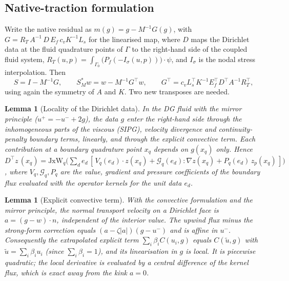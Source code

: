 \documentclass[11pt,a4paper]{article}
\newtheorem{lemma}[proposition]{Lemma}
\theoremstyle{definition}
\theoremstyle{remark}
\newcommand{\G}{\Gamma}
\newcommand{\M}{M}
\begin{document}
\subsection{Native-traction formulation}\label{sec:native_adjoint}

Write the native residual as $m(g) = g - \M^{-1}G(g)$, with
$G = R_T\,A^{-1}\,D\,E_f\,c_vK^{-1}L_s$ for the linearised map, where $D$ maps the Dirichlet data
at the fluid quadrature points of $\G$ to the right-hand side of the coupled fluid system,
$R_T(u,p) = \int_{\G_0}\big(P_f(-I_\sigma(u,p))\big)\cdot\psi$, and $I_\sigma$ is the nodal stress
interpolation. Then
\begin{equation}
  S = I - \M^{-1}G,\qquad S^*_{\M}w = w - \M^{-1}G^{\top}w,\qquad
  G^{\top} = c_v L_s^{\top}K^{-1}E_f^{\top}D^{\top}A^{-1}R_T^{\top},
\end{equation}
using again the symmetry of $A$ and $K$. Two new transposes are needed.

\begin{lemma}[Locality of the Dirichlet data]\label{lem:local}
In the DG fluid with the mirror principle ($u^+=-u^-+2g$), the data $g$ enter the right-hand side
through the inhomogeneous parts of the viscous (SIPG), velocity divergence and continuity-penalty
boundary terms, linearly, and through the explicit convective term. Each contribution at a boundary
quadrature point $x_q$ depends on $g(x_q)$ only. Hence
$D^{\top}z\,(x_q) = \mathrm{JxW}_q\big(\sum_d e_d\,[\,V_q(e_d)\cdot z(x_q) + \mathcal G_q(e_d):\nabla
z(x_q) + P_q(e_d)\,z_p(x_q)\,]\big)$, where $V_q,\mathcal G_q,P_q$ are the value, gradient and
pressure coefficients of the boundary flux evaluated with the operator kernels for the unit data
$e_d$.
\end{lemma}

\begin{lemma}[Explicit convective term]\label{lem:convective}
With the convective formulation and the mirror principle, the normal transport velocity on a
Dirichlet face is $a=(g-w)\cdot n$, independent of the interior value. The upwind flux minus the
strong-form correction equals $(a-\zeta|a|)(g-u^-)$ and is affine in $u^-$. Consequently the
extrapolated explicit term $\sum_i\beta_iC(u_i,g)$ equals $C(\tilde u,g)$ with
$\tilde u=\sum_i\beta_iu_i$ (since $\sum_i\beta_i=1$), and its linearisation in $g$ is local. It is
piecewise quadratic; the local derivative is evaluated by a central difference of the kernel flux,
which is exact away from the kink $a=0$.
\end{lemma}
\end{document}
